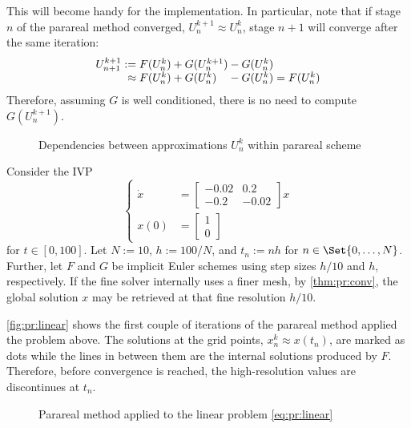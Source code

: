 This will become handy for the implementation.
In particular, note that if stage $n$ of the parareal method converged,
\ie $U^{k+1}_n \approx U^k_n$,
stage $n+1$ will converge after the same iteration:
\begin{equation}
  \begin{array}{r@{}l@{}l@{}l}
    U^{k+1}_{n+1}
    :={}      & F(U^k_n) &{}+ G(U^{k+1}_n) &{}- G(U^k_n) \\
    \approx{} & F(U^k_n) &{}+ G(U^k_n)     &{}- G(U^k_n)
    = F(U^k_n)
  \end{array}
\end{equation}
Therefore,
assuming $G$ is well conditioned,
there is no need to compute $G(U^{k+1}_n)$.

\begin{figure}[htb]
  \caption{Dependencies between approximations $U^k_n$ within parareal scheme}
\end{figure}

\begin{example}
  Consider the \ac{IVP}
  \begin{equation}
    \label{eq:pr:linear}
    \left\{
    \begin{aligned}
      \dot x &= \begin{bmatrix}
        -0.02 & 0.2 \\
        -0.2  & -0.02
      \end{bmatrix} x \\
      x(0) &= \begin{bmatrix}
        1 \\ 0
      \end{bmatrix}
    \end{aligned}
    \right.
  \end{equation}
  for $t\in[0,100]$.
  Let $N := 10$, $h := 100/N$, and $t_n := nh$ for $n\in\Set{0,\ldots,N}$.
  Further, let $F$ and $G$ be implicit Euler schemes using step sizes $h/10$ and $h$, respectively.
  If the fine solver internally uses a finer mesh,
  by \autoref{thm:pr:conv},
  the global solution $x$ may be retrieved at that fine resolution $h/10$.

  \autoref{fig:pr:linear} shows the first couple of iterations of the parareal method applied the problem above.
  The solutions at the grid points, $x^k_n \approx x(t_n)$, are marked as dots
  while the lines in between them are the internal solutions produced by $F$.
  Therefore, before convergence is reached,
  the high-resolution values are discontinues at $t_n$.
  \begin{figure}[htb]
    \caption{Parareal method applied to the linear problem \eqref{eq:pr:linear}}
    \label{fig:pr:linear}
  \end{figure}
\end{example}

